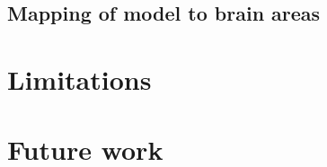 
\subsection{Mapping of model to brain areas}





\section{Limitations}


\section{Future work}







